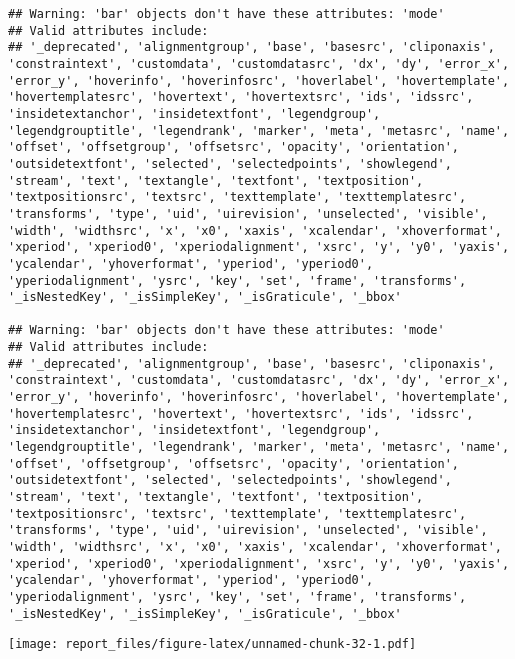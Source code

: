 \documentclass[
]{article}
\begin{document}
\begin{verbatim}
## Warning: 'bar' objects don't have these attributes: 'mode'
## Valid attributes include:
## '_deprecated', 'alignmentgroup', 'base', 'basesrc', 'cliponaxis', 'constraintext', 'customdata', 'customdatasrc', 'dx', 'dy', 'error_x', 'error_y', 'hoverinfo', 'hoverinfosrc', 'hoverlabel', 'hovertemplate', 'hovertemplatesrc', 'hovertext', 'hovertextsrc', 'ids', 'idssrc', 'insidetextanchor', 'insidetextfont', 'legendgroup', 'legendgrouptitle', 'legendrank', 'marker', 'meta', 'metasrc', 'name', 'offset', 'offsetgroup', 'offsetsrc', 'opacity', 'orientation', 'outsidetextfont', 'selected', 'selectedpoints', 'showlegend', 'stream', 'text', 'textangle', 'textfont', 'textposition', 'textpositionsrc', 'textsrc', 'texttemplate', 'texttemplatesrc', 'transforms', 'type', 'uid', 'uirevision', 'unselected', 'visible', 'width', 'widthsrc', 'x', 'x0', 'xaxis', 'xcalendar', 'xhoverformat', 'xperiod', 'xperiod0', 'xperiodalignment', 'xsrc', 'y', 'y0', 'yaxis', 'ycalendar', 'yhoverformat', 'yperiod', 'yperiod0', 'yperiodalignment', 'ysrc', 'key', 'set', 'frame', 'transforms', '_isNestedKey', '_isSimpleKey', '_isGraticule', '_bbox'

## Warning: 'bar' objects don't have these attributes: 'mode'
## Valid attributes include:
## '_deprecated', 'alignmentgroup', 'base', 'basesrc', 'cliponaxis', 'constraintext', 'customdata', 'customdatasrc', 'dx', 'dy', 'error_x', 'error_y', 'hoverinfo', 'hoverinfosrc', 'hoverlabel', 'hovertemplate', 'hovertemplatesrc', 'hovertext', 'hovertextsrc', 'ids', 'idssrc', 'insidetextanchor', 'insidetextfont', 'legendgroup', 'legendgrouptitle', 'legendrank', 'marker', 'meta', 'metasrc', 'name', 'offset', 'offsetgroup', 'offsetsrc', 'opacity', 'orientation', 'outsidetextfont', 'selected', 'selectedpoints', 'showlegend', 'stream', 'text', 'textangle', 'textfont', 'textposition', 'textpositionsrc', 'textsrc', 'texttemplate', 'texttemplatesrc', 'transforms', 'type', 'uid', 'uirevision', 'unselected', 'visible', 'width', 'widthsrc', 'x', 'x0', 'xaxis', 'xcalendar', 'xhoverformat', 'xperiod', 'xperiod0', 'xperiodalignment', 'xsrc', 'y', 'y0', 'yaxis', 'ycalendar', 'yhoverformat', 'yperiod', 'yperiod0', 'yperiodalignment', 'ysrc', 'key', 'set', 'frame', 'transforms', '_isNestedKey', '_isSimpleKey', '_isGraticule', '_bbox'
\end{verbatim}

\texttt{[image: report\_files/figure-latex/unnamed-chunk-32-1.pdf]}
\end{document}
